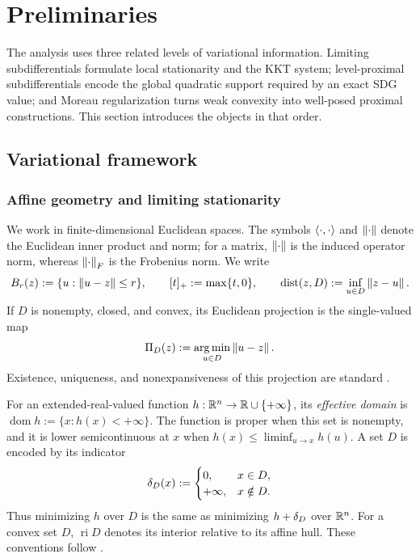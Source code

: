 \section{Preliminaries}
\label{sec:preliminaries}

The analysis uses three related levels of variational information.  Limiting
subdifferentials formulate local stationarity and the KKT system;
level-proximal subdifferentials encode the global quadratic support required
by an exact SDG value; and Moreau regularization turns weak convexity into
well-posed proximal constructions.  This section introduces the objects in
that order.

\subsection{Variational framework}

\subsubsection{Affine geometry and limiting stationarity}

We work in finite-dimensional Euclidean spaces.  The symbols
\(\left\langle \cdot,\cdot\right\rangle\) and \(\left\lVert \cdot\right\rVert\) denote the Euclidean inner product
and norm; for a matrix, \(\left\lVert \cdot\right\rVert\) is the induced operator norm, whereas
\(\left\lVert \cdot\right\rVert_{F}\) is the Frobenius norm.  We write
\[
  B_r(z):=\{u:\left\lVert u-z\right\rVert\le r\},
  \qquad
  [t]_+:=\max\{t,0\},
  \qquad
  \operatorname{dist}(z,D):=\inf_{u\in D}\left\lVert z-u\right\rVert.
\]
If \(D\) is nonempty, closed, and convex, its Euclidean projection is the
single-valued map
\[
  \Pi_D(z):=\operatorname*{arg\,min}_{u\in D}\left\lVert u-z\right\rVert.
\]
Existence, uniqueness, and nonexpansiveness of this projection are standard
\citep[Example~2.25 and Corollary~12.20]{RockafellarWets1998}.

For an extended-real-valued function \(h:\mathbb{R}^n\to\mathbb{R}\cup\{+\infty\}\), its
\emph{effective domain} is
\(\operatorname{dom}h:=\{x:h(x)<+\infty\}\).  The function is proper when
this set is nonempty, and it is lower semicontinuous at \(x\) when
\(h(x)\le\liminf_{u\to x}h(u)\).  A set \(D\) is encoded by its indicator
\[
  \delta_D(x):=
  \begin{cases}
    0,       &x\in D,\\
    +\infty, &x\notin D.
  \end{cases}
\]
Thus minimizing \(h\) over \(D\) is the same as minimizing
\(h+\delta_D\) over \(\mathbb{R}^n\).  For a convex set \(D\),
\(\operatorname{ri}D\) denotes its interior relative to its affine hull.
These conventions follow
\citet[Sections~1.A--B and~2.H]{RockafellarWets1998}.

